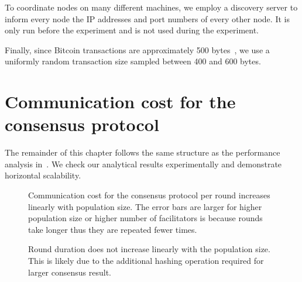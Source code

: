 To coordinate nodes on many different machines,
we employ a discovery server to inform every node the IP addresses and port numbers of every other node.
It is only run before the experiment and is not used during the experiment.

Finally, since Bitcoin transactions are approximately 500 bytes~\cite{txsize},
we use a uniformly random transaction size sampled between 400 and 600 bytes.


\section{Communication cost for the consensus protocol}
\label{sec:comms-cost-experiment}

The remainder of this chapter follows the same structure as the performance analysis in~.
We check our analytical results experimentally and demonstrate horizontal scalability.

\begin{figure}[tb]
  \centering
  \caption{Communication cost for the consensus protocol per round increases linearly with population size.
  The error bars are larger for higher population size or higher number of facilitators is because rounds take longer thus they are repeated fewer times.}
  \label{fig:round-comms}
\end{figure}

\begin{figure}[tb]
  \centering
  \caption{Round duration does not increase linearly with the population size. 
  This is likely due to the additional hashing operation required for larger consensus result.}
  \label{fig:round-duration}
\end{figure}

